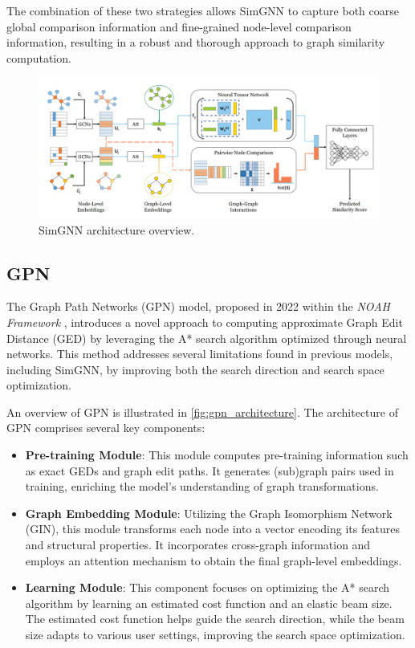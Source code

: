 \documentclass[../Thesis.tex]{subfiles}
\begin{document}
	The combination of these two strategies allows SimGNN to capture both coarse global comparison information and fine-grained node-level comparison information, resulting in a robust and thorough approach to graph similarity computation.
	
	\begin{figure}[H]
		\centering
		\includegraphics[width=\textwidth]{Images/simgnn_architecture.png}
		\caption{SimGNN architecture overview.}
		\label{fig:simgnn_architecture}
	\end{figure}

	
	\subsection{GPN}
	
	The Graph Path Networks (GPN) model, proposed in 2022 within the \textit{NOAH Framework} \cite{noah__neural_optimized_a*_search_algorithm_for_graph_edit_distance_computation}, introduces a novel approach to computing approximate Graph Edit Distance (GED) by leveraging the A* search algorithm optimized through neural networks. This method addresses several limitations found in previous models, including SimGNN, by improving both the search direction and search space optimization.
	
	An overview of GPN is illustrated in \autoref{fig:gpn_architecture}. The architecture of GPN comprises several key components:
	
	\begin{itemize}
		\item \textbf{Pre-training Module}: This module computes pre-training information such as exact GEDs and graph edit paths. It generates (sub)graph pairs used in training, enriching the model's understanding of graph transformations.
		\item \textbf{Graph Embedding Module}: Utilizing the Graph Isomorphism Network (GIN), this module transforms each node into a vector encoding its features and structural properties. It incorporates cross-graph information and employs an attention mechanism to obtain the final graph-level embeddings.
		\item \textbf{Learning Module}: This component focuses on optimizing the A* search algorithm by learning an estimated cost function and an elastic beam size. The estimated cost function helps guide the search direction, while the beam size adapts to various user settings, improving the search space optimization.
	\end{itemize}
	
\end{document}
